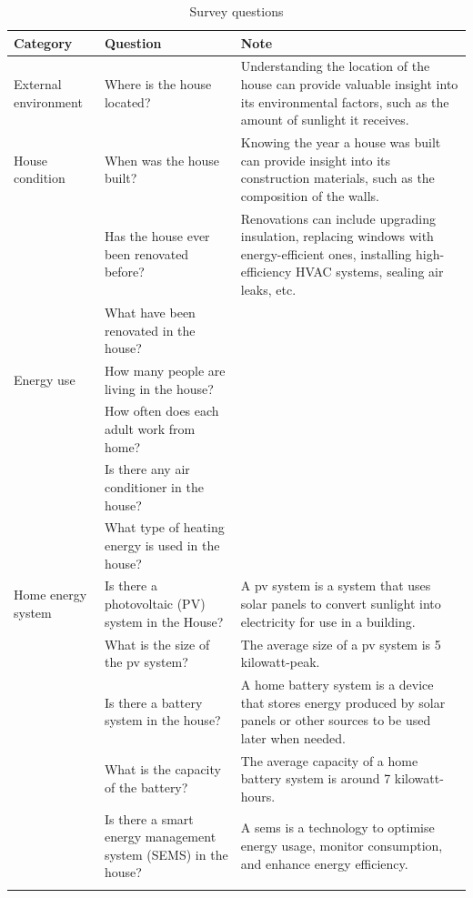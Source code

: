 \begin{center}
  \small
    \begin{longtable}{ | p{} | p{} | p{} | }
        \hline
        Category & Question & Note \\
        \hline
        External environment & Where is the house located? & Understanding the location of the house can provide valuable insight into its environmental factors, such as the amount of sunlight it receives. \\
        \hline
        House condition & When was the house built? & Knowing the year a house was built can provide insight into its construction materials, such as the composition of the walls. \\
          & Has the house ever been renovated before? & Renovations can include upgrading insulation, replacing windows with energy-efficient ones, installing high-efficiency HVAC systems, sealing air leaks, etc. \\
          & What have been renovated in the house? &   \\
        \hline
        Energy use & How many people are living in the house? &   \\
          & How often does each adult work from home? &   \\
          & Is there any air conditioner in the house? &   \\
          & What type of heating energy is used in the house? &   \\
        \hline
        Home energy system  & Is there a photovoltaic (PV) system in the House? & A \gls{pv} system is a system that uses solar panels to convert sunlight into electricity for use in a building. \\    
          & What is the size of the \gls{pv} system? & The average size of a \gls{pv} system is 5 kilowatt-peak. \\
          & Is there a battery system in the house? & A home battery system is a device that stores energy produced by solar panels or other sources to be used later when needed. \\
          & What is the capacity of the battery? & The average capacity of a home battery system is around 7 kilowatt-hours. \\
          & Is there a smart energy management system (SEMS) in the house? & A \gls{sems} is a technology to optimise energy usage, monitor consumption, and enhance energy efficiency. \\
        \hline
    \caption{Survey questions}
    \label{tab:questions}
    \end{longtable}
\end{center}

